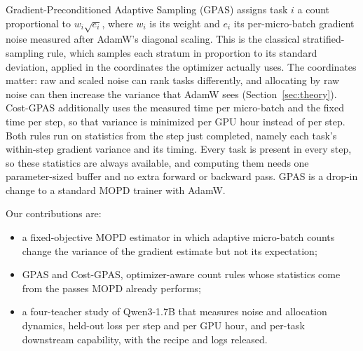 Gradient-Preconditioned Adaptive Sampling (GPAS) assigns task $i$ a count
proportional to $w_i\sqrt{e_i}$, where $w_i$ is its weight and $e_i$ its
per-micro-batch gradient noise measured after AdamW's diagonal scaling. This
is the classical stratified-sampling rule, which samples each stratum in
proportion to its standard deviation, applied in the coordinates the optimizer
actually uses. The coordinates matter: raw and scaled noise can rank tasks
differently, and allocating by raw noise can then increase the variance that
AdamW sees (Section~\ref{sec:theory}). Cost-GPAS additionally uses the
measured time per micro-batch and the fixed time per step, so that variance is
minimized per GPU hour instead of per step. Both rules run on statistics from
the step just completed, namely each task's within-step gradient variance and
its timing. Every task is present in every step, so these statistics are
always available, and computing them needs one parameter-sized buffer and no
extra forward or backward pass. GPAS is a drop-in change to a standard MOPD
trainer with AdamW.


Our contributions are:
\begin{itemize}
    \item a fixed-objective MOPD estimator in which adaptive micro-batch
    counts change the variance of the gradient estimate but not its
    expectation;
    \item GPAS and Cost-GPAS, optimizer-aware count rules whose statistics
    come from the passes MOPD already performs;
    \item a four-teacher study of Qwen3-1.7B that measures noise and
    allocation dynamics, held-out loss per step and per GPU hour, and
    per-task downstream capability, with the recipe and logs released.
\end{itemize}
